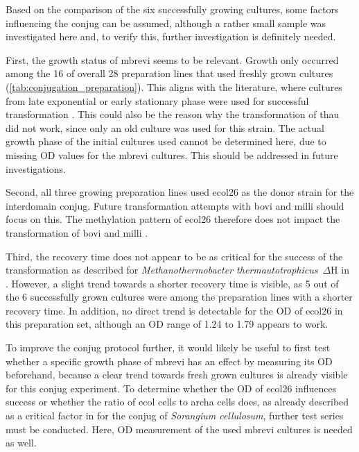 Based on the comparison of the six successfully growing cultures, some factors influencing the \gls{conjug} can be assumed, although a rather small sample was investigated here and, to verify this, further investigation is definitely needed.

First, the growth status of \acrlong{mbrevi} seems to be relevant. Growth only occurred among the 16 of overall 28 preparation lines that used freshly grown cultures (\cref{tab:conjugation_preparation}). This aligns with the literature, where cultures from late exponential or early stationary phase were used for successful transformation \parencite{capovillaTransformationPlasmidDNA2025, finkShuttlevectorSystemAllows2021}. This could also be the reason why the transformation of \acrshort{thau} did not work, since only an old culture was used for this strain. The actual growth phase of the initial cultures used cannot be determined here, due to missing \acrshort{OD} values for the \acrlong{mbrevi} cultures. This should be addressed in future investigations.

Second, all three growing preparation lines used \acrshort{ecol26} as the donor strain for the interdomain \gls{conjug}. Future transformation attempts with \acrshort{bovi} and \acrshort{milli} should focus on this. The methylation pattern of \acrshort{ecol26} therefore does not impact the transformation of \acrshort{bovi} and \acrshort{milli} \parencite[SI]{schwalenBioinformaticExpansionDiscovery2018a}.

Third, the recovery time does not appear to be as critical for the success of the transformation as described for \textit{Methanothermobacter thermautotrophicus}~$\Delta$H in \citet{finkShuttlevectorSystemAllows2021}. However, a slight trend towards a shorter recovery time is visible, as 5 out of the 6 successfully grown cultures were among the preparation lines with a shorter recovery time. In addition, no direct trend is detectable for the OD of \acrshort{ecol26} in this preparation set, although an OD range of 1.24 to 1.79 appears to work.

To improve the \gls{conjug} protocol further, it would likely be useful to first test whether a specific growth phase of \acrlong{mbrevi} has an effect by measuring its \acrshort{OD} beforehand, because a clear trend towards fresh grown cultures is already visible for this \gls{conjug} experiment. 
To determine whether the \acrshort{OD} of \acrshort{ecol26} influences success or whether the ratio of \acrshort{ecol} cells to \gls{archa} cells does, as already described  as a critical factor in \textcite{koppCriticalVariationsConjugational2004} for the \gls{conjug} of \textit {Sorangium cellulosum}, further test series must be conducted. Here, \acrshort{OD} measurement of the used \acrlong{mbrevi} cultures is needed as well.


